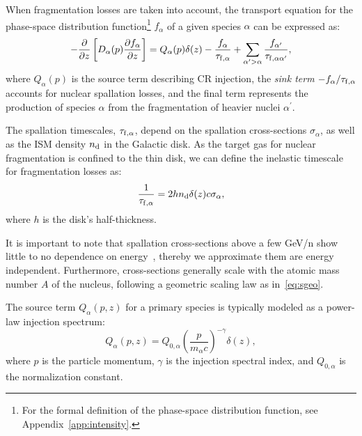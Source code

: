 When fragmentation losses are taken into account, the transport equation for the phase-space distribution function\footnote{For the formal definition of the phase-space distribution function, see Appendix~\ref{app:intensity}.} \(f_\alpha\) of a given species \(\alpha\) can be expressed as:  
\begin{equation}
-\frac{\partial}{\partial z} \left[ D_\alpha(p) \frac{\partial f_\alpha}{\partial z} \right] = 
Q_\alpha(p) \delta(z) - \frac{f_\alpha}{\tau_{\rm f, \alpha}} + \sum_{\alpha^\prime > \alpha}  \frac{f_{\alpha^\prime}}{\tau_{\rm f, \alpha\alpha^\prime}},
\end{equation}
where \(Q_\alpha(p)\) is the source term describing CR injection, the \emph{sink term} \(-f_\alpha / \tau_{\rm f, \alpha}\) accounts for nuclear spallation losses, and the final term represents the production of species \(\alpha\) from the fragmentation of heavier nuclei \(\alpha^\prime\).  

The spallation timescales, \(\tau_{\rm f, \alpha}\), depend on the spallation cross-sections \(\sigma_\alpha\), as well as the ISM density \(n_{\rm d}\) in the Galactic disk. 
%
As the target gas for nuclear fragmentation is confined to the thin disk, we can define the inelastic timescale for fragmentation losses as:  
\begin{equation}
\frac{1}{\tau_{\rm f, \alpha}} = 2 h n_{\rm d} \delta (z) c \sigma_\alpha,
\end{equation}
where \(h\) is the disk's half-thickness.

It is important to note that spallation cross-sections above a few GeV/n show little to no dependence on energy~\cite{Evoli2019prd}, thereby we approximate them are energy independent. Furthermore, cross-sections generally scale with the atomic mass number \(A\) of the nucleus, following a geometric scaling law as in~\ref{eq:sgeo}. 


The source term \(Q_\alpha(p, z)\) for a primary species is typically modeled as a power-law injection spectrum:  
\begin{equation}
Q_\alpha(p, z) = Q_{0,\alpha} \left(\frac{p}{m_\alpha c}\right)^{-\gamma} \delta (z),
\end{equation}
where \(p\) is the particle momentum, \(\gamma\) is the injection spectral index, and \(Q_{0,\alpha}\) is the normalization constant.  

